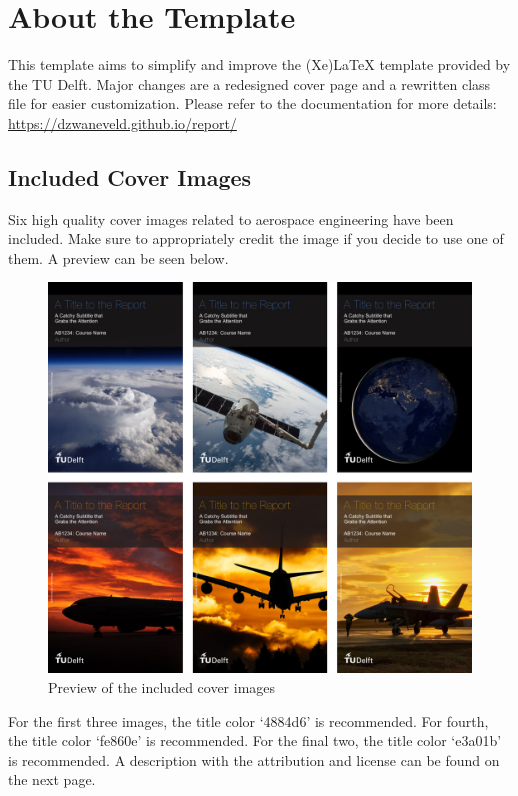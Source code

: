 \chapter{About the Template}
\label{chapter:title}

This template aims to simplify and improve the (Xe)LaTeX template provided by the TU Delft. Major changes are a redesigned cover page and a rewritten class file for easier customization. Please refer to the documentation for more details: \url{https://dzwaneveld.github.io/report/}

\section{Included Cover Images}

Six high quality cover images related to aerospace engineering have been included. Make sure to appropriately credit the image if you decide to use one of them. A preview can be seen below.

\begin{figure}[h]
    \centering
    \includegraphics[width=0.75\linewidth]{figures/covers.png}
    \caption{Preview of the included cover images}
\end{figure}

\noindent For the first three images, the title color `4884d6' is recommended. For fourth, the title color `fe860e' is recommended. For the final two, the title color `e3a01b' is recommended. A description with the attribution and license can be found on the next page.

